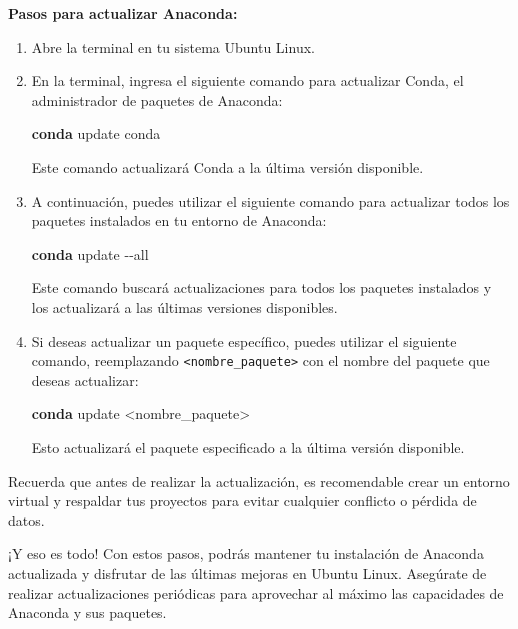 \documentclass[
  a4paper,
]{article}
\newenvironment{Shaded}{}{}
\newcommand{\AttributeTok}[1]{\textcolor[rgb]{0.84,0.23,0.29}{#1}}
\newcommand{\ExtensionTok}[1]{\textcolor[rgb]{0.84,0.23,0.29}{\textbf{#1}}}
\newcommand{\NormalTok}[1]{\textcolor[rgb]{0.14,0.16,0.18}{#1}}
\newcommand{\OperatorTok}[1]{\textcolor[rgb]{0.14,0.16,0.18}{#1}}
\begin{document}
\textbf{Pasos para actualizar Anaconda:}

\begin{enumerate}
\def\labelenumi{\arabic{enumi}.}
\item
  Abre la terminal en tu sistema Ubuntu Linux.
\item
  En la terminal, ingresa el siguiente comando para actualizar Conda, el
  administrador de paquetes de Anaconda:

\begin{Shaded}
\begin{Highlighting}[]
\ExtensionTok{conda}\NormalTok{ update conda}
\end{Highlighting}
\end{Shaded}

  Este comando actualizará Conda a la última versión disponible.
\item
  A continuación, puedes utilizar el siguiente comando para actualizar
  todos los paquetes instalados en tu entorno de Anaconda:

\begin{Shaded}
\begin{Highlighting}[]
\ExtensionTok{conda}\NormalTok{ update }\AttributeTok{{-}{-}all}
\end{Highlighting}
\end{Shaded}

  Este comando buscará actualizaciones para todos los paquetes
  instalados y los actualizará a las últimas versiones disponibles.
\item
  Si deseas actualizar un paquete específico, puedes utilizar el
  siguiente comando, reemplazando
  \texttt{\textless{}nombre\_paquete\textgreater{}} con el nombre del
  paquete que deseas actualizar:

\begin{Shaded}
\begin{Highlighting}[]
\ExtensionTok{conda}\NormalTok{ update }\OperatorTok{\textless{}}\NormalTok{nombre\_paquete}\OperatorTok{\textgreater{}}
\end{Highlighting}
\end{Shaded}

  Esto actualizará el paquete especificado a la última versión
  disponible.
\end{enumerate}

Recuerda que antes de realizar la actualización, es recomendable crear
un entorno virtual y respaldar tus proyectos para evitar cualquier
conflicto o pérdida de datos.

¡Y eso es todo! Con estos pasos, podrás mantener tu instalación de
Anaconda actualizada y disfrutar de las últimas mejoras en Ubuntu Linux.
Asegúrate de realizar actualizaciones periódicas para aprovechar al
máximo las capacidades de Anaconda y sus paquetes.
\end{document}
